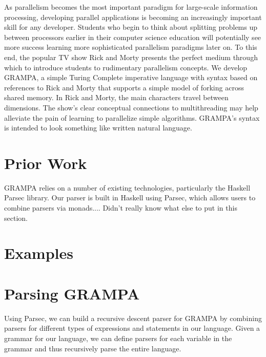 \documentclass[numbers]{sigplanconf}
\begin{document}
As parallelism becomes the most important paradigm for large-scale information processing, developing parallel applications is becoming an increasingly important skill for any developer. Students who begin to think about splitting problems up between processors earlier in their computer science education will potentially see more success learning more sophisticated parallelism paradigms later on. To this end, the popular TV show Rick and Morty presents the perfect medium through which to introduce students to rudimentary parallelism concepts. We develop GRAMPA, a simple Turing Complete imperative language with syntax based on references to Rick and Morty that supports a simple model of forking across shared memory. In Rick and Morty, the main characters travel between dimensions. The show's clear conceptual connections to multithreading may help alleviate the pain of learning to parallelize simple algorithms. GRAMPA's syntax is intended to look something like written natural language.

\section{Prior Work}

GRAMPA relies on a number of existing technologies, particularly the Haskell Parsec library. Our parser is built in Haskell using Parsec, which allows users to combine parsers via monads.... Didn't really know what else to put in this section.

\section{Examples}

\section{Parsing GRAMPA}

Using Parsec, we can build a recursive descent parser for GRAMPA by combining parsers for different types of expressions and statements in our language. Given a grammar for our language, we can define parsers for each variable in the grammar and thus recursively parse the entire language.
\end{document}
